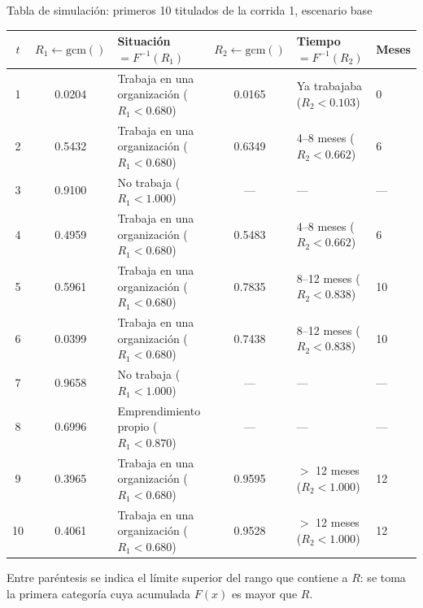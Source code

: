 \begin{mitabla}{Tabla de simulación: primeros 10 titulados de la corrida 1, escenario base \datosprueba}
\scriptsize
\begin{tabular}{cclcll}
\toprule
$t$ & $R_1 \leftarrow \text{gcm}()$ & Situación $= F^{-1}(R_1)$ & $R_2 \leftarrow \text{gcm}()$ & Tiempo $= F^{-1}(R_2)$ & Meses \\
\midrule
1 & 0.0204 & Trabaja en una organización {\scriptsize ($R_1 < 0.680$)} & 0.0165 & Ya trabajaba {\scriptsize ($R_2 < 0.103$)} & 0 \\
2 & 0.5432 & Trabaja en una organización {\scriptsize ($R_1 < 0.680$)} & 0.6349 & 4–8 meses {\scriptsize ($R_2 < 0.662$)} & 6 \\
3 & 0.9100 & No trabaja {\scriptsize ($R_1 < 1.000$)} & --- & --- & --- \\
4 & 0.4959 & Trabaja en una organización {\scriptsize ($R_1 < 0.680$)} & 0.5483 & 4–8 meses {\scriptsize ($R_2 < 0.662$)} & 6 \\
5 & 0.5961 & Trabaja en una organización {\scriptsize ($R_1 < 0.680$)} & 0.7835 & 8–12 meses {\scriptsize ($R_2 < 0.838$)} & 10 \\
6 & 0.0399 & Trabaja en una organización {\scriptsize ($R_1 < 0.680$)} & 0.7438 & 8–12 meses {\scriptsize ($R_2 < 0.838$)} & 10 \\
7 & 0.9658 & No trabaja {\scriptsize ($R_1 < 1.000$)} & --- & --- & --- \\
8 & 0.6996 & Emprendimiento propio {\scriptsize ($R_1 < 0.870$)} & --- & --- & --- \\
9 & 0.3965 & Trabaja en una organización {\scriptsize ($R_1 < 0.680$)} & 0.9595 & $>$ 12 meses {\scriptsize ($R_2 < 1.000$)} & 12 \\
10 & 0.4061 & Trabaja en una organización {\scriptsize ($R_1 < 0.680$)} & 0.9528 & $>$ 12 meses {\scriptsize ($R_2 < 1.000$)} & 12 \\
\bottomrule
\end{tabular}
\end{mitabla}

Entre paréntesis se indica el límite superior del rango que contiene a $R$: se toma la primera categoría cuya acumulada $F(x)$ es mayor que $R$.

